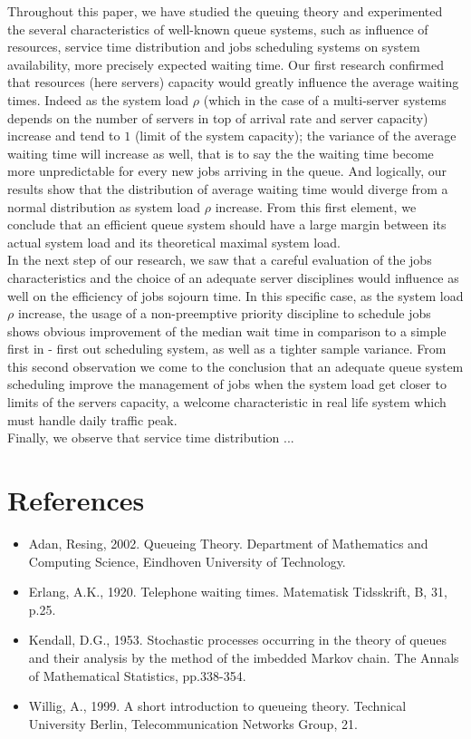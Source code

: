 \documentclass{article}
\begin{document}
    Throughout this paper, we have studied the queuing theory and experimented the several characteristics of well-known queue systems, such as influence of resources, service time distribution and jobs scheduling systems on system availability, more precisely expected waiting time.
    Our first research confirmed that resources (here servers) capacity would greatly influence the average waiting times. Indeed as the system load $\rho$ (which in the case of a multi-server systems depends on the number of servers in top of arrival rate and server capacity) increase and tend to $1$ (limit of the system capacity); the variance of the average waiting time will increase as well, that is to say the the waiting time become more unpredictable for every new jobs arriving in the queue. And logically, our results show that the distribution of average waiting time would diverge from a normal distribution as system load $\rho$ increase.
    From this first element, we conclude that an efficient queue system should have a large margin between its actual system load and its theoretical maximal system load.\\
    In the next step of our research, we saw that a careful evaluation of the jobs characteristics and the choice of an adequate server disciplines  would influence as well on the efficiency of jobs sojourn time.
    In this specific case, as the system load $\rho$ increase,  the usage of a non-preemptive priority discipline to schedule jobs shows obvious improvement of the median wait time in comparison to a simple first in - first out scheduling system, as well as a tighter sample variance. From this second observation we come to the conclusion that an adequate queue system scheduling improve the management of jobs when the system load get closer to limits of the servers capacity, a welcome characteristic in real life system which must handle daily traffic peak.\\
    Finally, we observe that service time distribution ...


    \clearpage

    \section*{References}

    \begin{itemize}
        \item[] Adan, Resing, 2002. Queueing Theory. Department of Mathematics and Computing Science, Eindhoven University of Technology.
        \item[] Erlang, A.K., 1920. Telephone waiting times. Matematisk Tidsskrift, B, 31, p.25.
        \item[] Kendall, D.G., 1953. Stochastic processes occurring in the theory of queues and their analysis by the method of the imbedded Markov chain. The Annals of Mathematical Statistics, pp.338-354.
        \item[] Willig, A., 1999. A short introduction to queueing theory. Technical University Berlin, Telecommunication Networks Group, 21.
    \end{itemize}

    \clearpage

    \appendix
    \appendixpage
\end{document}
